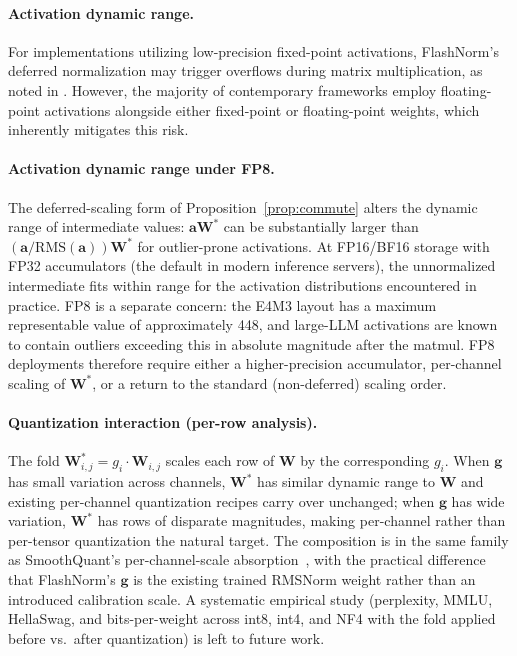 \documentclass{article}
\begin{document}
\paragraph{Activation dynamic range.}
For implementations utilizing low-precision fixed-point activations, FlashNorm's deferred
normalization may trigger overflows during matrix multiplication, as noted in \citep{MXNorm}.
However, the majority of contemporary frameworks employ floating-point activations alongside
either fixed-point or floating-point weights, which inherently mitigates this risk.

\paragraph{Activation dynamic range under FP8.} The deferred-scaling form of Proposition~\ref{prop:commute} alters the dynamic range of intermediate values: $\mathbf{a}\mathbf{W}^*$ can be substantially larger than $(\mathbf{a}/\mathrm{RMS}(\mathbf{a}))\mathbf{W}^*$ for outlier-prone activations. At FP16/BF16 storage with FP32 accumulators (the default in modern inference servers), the unnormalized intermediate fits within range for the activation distributions encountered in practice. FP8 is a separate concern: the E4M3 layout has a maximum representable value of approximately 448, and large-LLM activations are known to contain outliers exceeding this in absolute magnitude after the matmul. FP8 deployments therefore require either a higher-precision accumulator, per-channel scaling of $\mathbf{W}^*$, or a return to the standard (non-deferred) scaling order.

\paragraph{Quantization interaction (per-row analysis).} The fold $\mathbf{W}^*_{i,j} = g_i \cdot \mathbf{W}_{i,j}$ scales each row of $\mathbf{W}$ by the corresponding $g_i$. When $\mathbf{g}$ has small variation across channels, $\mathbf{W}^*$ has similar dynamic range to $\mathbf{W}$ and existing per-channel quantization recipes carry over unchanged; when $\mathbf{g}$ has wide variation, $\mathbf{W}^*$ has rows of disparate magnitudes, making per-channel rather than per-tensor quantization the natural target. The composition is in the same family as SmoothQuant's per-channel-scale absorption~\citep{smoothQuant}, with the practical difference that FlashNorm's $\mathbf{g}$ is the existing trained RMSNorm weight rather than an introduced calibration scale. A systematic empirical study (perplexity, MMLU, HellaSwag, and bits-per-weight across int8, int4, and NF4 with the fold applied before vs.\ after quantization) is left to future work.
\end{document}

